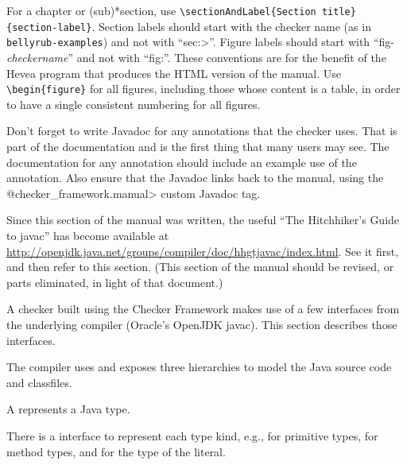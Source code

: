 For a chapter or (sub)*section, use \verb|\sectionAndLabel{Section title}{section-label}|.
Section labels should start with the checker
name (as in \verb|bellyrub-examples|) and not with ``\<sec:>''.
Figure labels should start with ``fig-\emph{checkername}'' and not with ``fig:''.
These conventions are for the benefit of the Hevea program that produces
the HTML version of the manual.
Use \verb|\begin{figure}| for all figures, including those whose
content is a table, in order to have a single consistent numbering for all
figures.

Don't forget to write Javadoc for any annotations that the checker uses.
That is part of the documentation and is the first thing that many users
may see.  The documentation for any annotation should include an example
use of the annotation.
Also ensure that the Javadoc links back to the manual, using the
\<@checker\_framework.manual> custom Javadoc tag.



Since this section of the manual was written, the useful ``The Hitchhiker's
Guide to javac'' has become available at
\url{http://openjdk.java.net/groups/compiler/doc/hhgtjavac/index.html}.
See it first, and then refer to this section.  (This section of the manual
should be revised, or parts eliminated, in light of that document.)


A checker built using the Checker Framework makes use of a few interfaces
from the underlying compiler (Oracle's OpenJDK javac).
This section describes those interfaces.





The compiler uses and exposes three hierarchies to model the Java
source code and classfiles.



A  represents a Java type.

\begin{sloppypar}
There is a  interface to represent each type kind,
e.g.,  for primitive types, 
for method types, and  for the type of the  literal.
\end{sloppypar}

